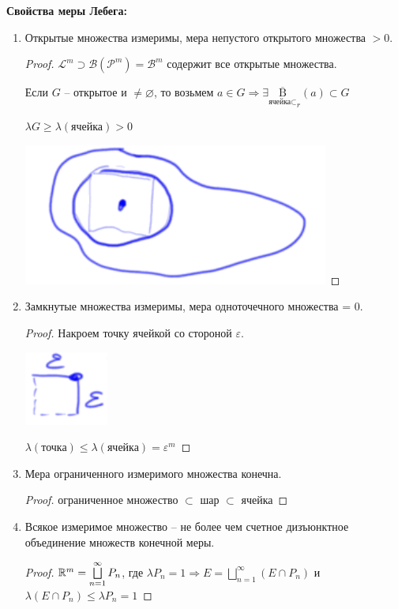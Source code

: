 \textbf{Свойства меры Лебега:}
\begin{enumerate}
    \item Открытые множества измеримы, мера непустого открытого множества $>0$.
    
    \begin{proof}
        $\mathcal{L}^m\supset \mathcal{B}(\mathcal{P}^m)=\mathcal{B}^m$ содержит все открытые множества.

        Если $G$ – открытое и $\not = \varnothing$, то возьмем $a\in G\Rightarrow
        \exists \underset{\text{ячейка}\subset}{\overline{\text{B}}}_r(a)\subset G$

        $\lambda G\geq \lambda (\text{ячейка})>0$

        \includegraphics[width=0.15\linewidth]{images/23-09-21-2.png}
    \end{proof}
    \item Замкнутые множества измеримы, мера одноточечного множества = 0.
    
    \begin{proof}
        Накроем точку ячейкой со стороной $\varepsilon$.

        \includegraphics[width=0.05\linewidth]{images/23-09-21-3.png}
        
        $\lambda(\text{точка})\leq \lambda (\text{ячейка}) =\varepsilon^m$
    \end{proof}

    \item Мера ограниченного измеримого множества конечна.
    
    \begin{proof}
        ограниченное множество $\subset$ шар $\subset$ ячейка
    \end{proof}

    \item Всякое измеримое множество – не более чем счетное дизъюнктное объединение множеств конечной меры.
    
    \begin{proof}
        $\mathbb{R}^m =\bigsqcup\limits_{n=1}^\infty P_n$, где $\lambda P_n = 1\Rightarrow E =\bigsqcup\limits_{n=1}^\infty (E\cap P_n)$ и
        $\lambda (E\cap P_n)\leq \lambda P_n = 1$
    \end{proof}


\end{enumerate}
